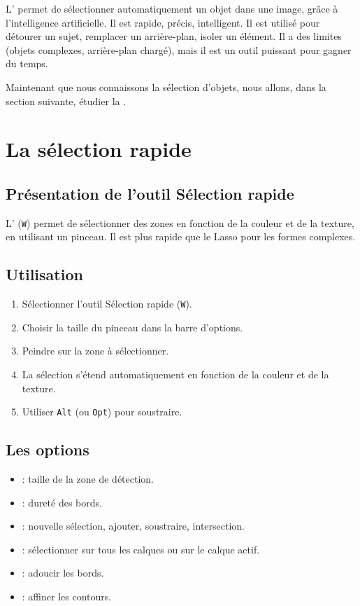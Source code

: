L' permet de sélectionner automatiquement un objet dans une image, grâce à l'intelligence artificielle. Il est rapide, précis, intelligent. Il est utilisé pour détourer un sujet, remplacer un arrière-plan, isoler un élément. Il a des limites (objets complexes, arrière-plan chargé), mais il est un outil puissant pour gagner du temps.

Maintenant que nous connaissons la sélection d'objets, nous allons, dans la section suivante, étudier la .

\section{La sélection rapide}

\subsection{Présentation de l'outil Sélection rapide}

L' (\texttt{W}) permet de sélectionner des zones en fonction de la couleur et de la texture, en utilisant un pinceau. Il est plus rapide que le Lasso pour les formes complexes.

\subsection{Utilisation}

\begin{enumerate}
    \item Sélectionner l'outil Sélection rapide (\texttt{W}).
    \item Choisir la taille du pinceau dans la barre d'options.
    \item Peindre sur la zone à sélectionner.
    \item La sélection s'étend automatiquement en fonction de la couleur et de la texture.
    \item Utiliser \texttt{Alt} (ou \texttt{Opt}) pour soustraire.
\end{enumerate}

\subsection{Les options}

\begin{itemize}
    \item {} : taille de la zone de détection.
    \item {} : dureté des bords.
    \item {} : nouvelle sélection, ajouter, soustraire, intersection.
    \item {} : sélectionner sur tous les calques ou sur le calque actif.
    \item {} : adoucir les bords.
    \item {} : affiner les contours.
\end{itemize}

